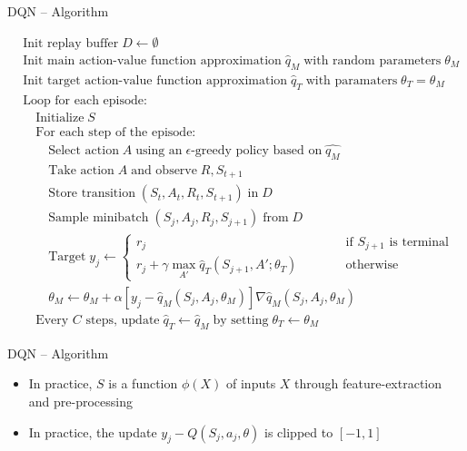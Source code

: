 \documentclass[ignorenonframetext,xcolor=x11names]{beamer}
\begin{document}
\begin{frame}[label=full]{DQN -- Algorithm}
\footnotesize
\begin{block}{}
\vspace{-\baselineskip}
\begin{align*}
& \text{Init replay buffer}\;D \leftarrow \emptyset \\
& \text{Init main action-value function approximation}\;\hat{q}_M\;\text{with random parameters}\;\theta_M \\
& \text{Init target action-value function approximation}\;\hat{q}_T\;\text{with paramaters}\;\theta_T=\theta_M \\
& \text{Loop for each episode:}\\
& \quad \text{Initialize}\;S \\
& \quad \text{For each step of the episode:} \\
& \quad \quad \text{Select action}\; A \; \text{using an} \; \text{$\epsilon$-greedy policy based on}\; \hat{q_M}\\
& \quad \quad \text{Take action} \; A \; \text{and observe}\;R, S_{t+1} \\
& \quad \quad \text{Store transition} \; (S_t , A_t , R_t , S_{t+1} ) \; \text{in} \; D \\
& \quad \quad \text{Sample minibatch} \; (S_j , A_j , R_j , S_{j+1} ) \; \text{from} \; D \\
& \quad \quad \text{Target}\;y_j \leftarrow \begin{cases} r_j & \qquad \quad \text{if $S_{j+1}$ is terminal} \\
r_j + \gamma \max_{A'} \hat{q}_T(S_{j+1}, A'; \theta_T) & \qquad \quad \text{otherwise}\end{cases} \\
& \quad \quad \theta_M \leftarrow \theta_M + \alpha [y_j - \hat{q}_M (S_j, A_j, \theta_M)] \nabla \hat{q}_M(S_j, A_j, \theta_M) \hspace{1in} \\
& \quad \text{Every $C$ steps, update}\; \hat{q}_T \leftarrow \hat{q}_M\;\text{by setting}\; \theta_T \leftarrow \theta_M
\end{align*}
\vspace{-\baselineskip}
\end{block}
\end{frame}

\begin{frame}[label=full]{DQN -- Algorithm}
\begin{itemize}
   \item In practice, $S$ is a function $\phi(X)$ of inputs $X$ through feature-extraction and pre-processing
   \item In practice, the update $y_j - Q(S_j, a_j, \theta)$ is clipped to $[-1, 1]$
   \end{itemize}
\end{frame}
\end{document}
